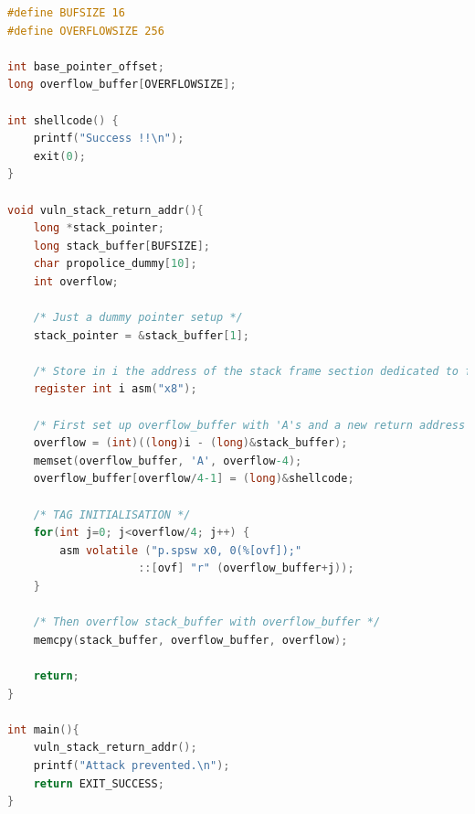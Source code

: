 \begin{lstlisting}[style=topPosition, language=C, label=code:buffer_overflow, caption=Buffer overflow C code]
#define BUFSIZE 16
#define OVERFLOWSIZE 256

int base_pointer_offset;
long overflow_buffer[OVERFLOWSIZE];

int shellcode() {
    printf("Success !!\n");
    exit(0);
}

void vuln_stack_return_addr(){
    long *stack_pointer;
    long stack_buffer[BUFSIZE];
    char propolice_dummy[10];
    int overflow;
    
    /* Just a dummy pointer setup */
    stack_pointer = &stack_buffer[1];
    
    /* Store in i the address of the stack frame section dedicated to function arguments */
    register int i asm("x8");  
    
    /* First set up overflow_buffer with 'A's and a new return address */
    overflow = (int)((long)i - (long)&stack_buffer);
    memset(overflow_buffer, 'A', overflow-4);
    overflow_buffer[overflow/4-1] = (long)&shellcode;

    /* TAG INITIALISATION */
    for(int j=0; j<overflow/4; j++) {
        asm volatile ("p.spsw x0, 0(%[ovf]);"                
                    ::[ovf] "r" (overflow_buffer+j));
    }

    /* Then overflow stack_buffer with overflow_buffer */
    memcpy(stack_buffer, overflow_buffer, overflow); 
    
    return;
}

int main(){
    vuln_stack_return_addr();
    printf("Attack prevented.\n");
    return EXIT_SUCCESS;
}\end{lstlisting}

